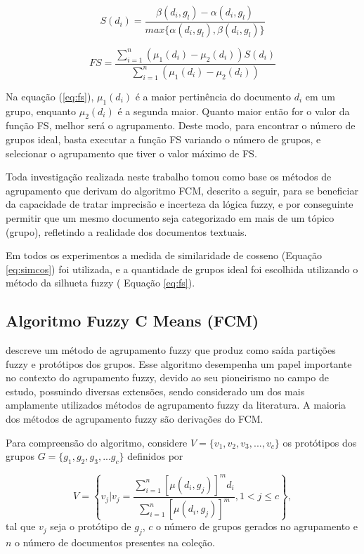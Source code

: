 \begin{equation} 
S(d_i) = \frac{\beta(d_i, g_l) - \alpha(d_i,g_l)}{max\{\alpha(d_i,g_l), \beta(d_i,g_l)\}} \label{eq:silhuette}
\end{equation}


\begin{equation} 
FS = \frac{\sum_{i=1}^n{(\mu_1(d_i) - \mu_2(d_i))}S(d_i)}{\sum_{i=1}^n{(\mu_1(d_i) - \mu_2(d_i))}}
\label{eq:fs}
\end{equation} 

Na equação (\ref{eq:fs}), $\mu_1(d_i)$ é a maior
  pertinência do documento $d_i$ em um grupo, enquanto $\mu_2(d_i)$ é a segunda maior. Quanto maior
  então for o valor da função FS, melhor será o agrupamento. Deste modo, para encontrar o número de
  grupos ideal, basta executar a função FS variando o número de grupos, e selecionar o agrupamento
  que tiver o valor máximo de FS.

Toda investigação realizada neste trabalho tomou como base os métodos de agrupamento que derivam do
algoritmo FCM\cite{Bezdek1984}, descrito a seguir, para se beneficiar da capacidade de tratar imprecisão e incerteza da
lógica fuzzy, e por conseguinte permitir que um mesmo documento seja categorizado em mais de um
tópico (grupo), refletindo a realidade dos documentos textuais. 

Em todos os experimentos a medida de similaridade de cosseno (Equação \ref{eq:simcos}) foi utilizada, e a quantidade de grupos ideal foi escolhida utilizando o método da silhueta fuzzy ( Equação \ref{eq:fs}).

\subsection{Algoritmo Fuzzy C Means (FCM)} 

\cite{Bezdek1984} descreve um método de agrupamento fuzzy
que produz como saída partições fuzzy e protótipos dos grupos. Esse algoritmo desempenha um papel
importante no contexto do agrupamento fuzzy, devido ao seu pioneirismo no campo de estudo, possuindo
diversas extensões, sendo considerado um dos mais amplamente utilizados métodos de
agrupamento fuzzy da literatura\cite{Pal2005}. A maioria dos métodos de agrupamento fuzzy são
derivações do FCM\cite{Krishnapuram1993}.

Para compreensão do algoritmo, considere $V = \{v_1,v_2,v_3,...,v_c\}$ os protótipos dos grupos $G = \{g_1,g_2,g_3,...g_c\}$
definidos por 

\begin{equation} 
  V = \left\{ v_j | v_j = \frac{\sum_{i=1}^n[\mu(d_i,g_j)]^m d_i}{\sum_{i=1}^n[\mu(d_i,g_j)]^m}, 
  1 < j \leq c \right\}, 
  \label{eq:prototipos} 
\end{equation}
tal que $v_j$ seja o protótipo de $g_j$, $c$ o número de grupos gerados no agrupamento e $n$ o número de
documentos presentes na coleção. 

